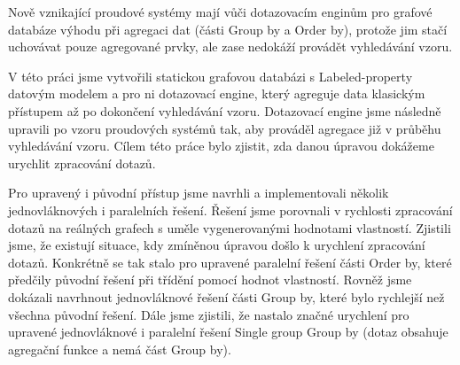 \documentclass[12pt]{report}
\begin{document}
Nově vznikající proudové systémy mají vůči dotazovacím enginům pro grafové databáze výhodu při agregaci dat (části Group by a Order by), protože jim stačí uchovávat pouze agregované prvky, ale zase nedokáží provádět vyhledávání vzoru.

V této práci jsme vytvořili statickou grafovou databázi s Labeled-property datovým modelem a pro ni dotazovací engine, který agreguje data klasickým přístupem až po dokončení vyhledávání vzoru.
Dotazovací engine jsme následně upravili po vzoru proudových systémů tak, aby prováděl agregace již v průběhu vyhledávání vzoru.
Cílem této práce bylo zjistit, zda danou úpravou dokážeme urychlit zpracování dotazů.

Pro upravený i původní přístup jsme navrhli a implementovali několik jednovláknových i paralelních řešení.
Řešení jsme porovnali v rychlosti zpracování dotazů na reálných grafech s uměle vygenerovanými hodnotami vlastností.
Zjistili jsme, že existují situace, kdy zmíněnou úpravou došlo k urychlení zpracování dotazů.
Konkrétně se tak stalo pro upravené paralelní řešení části Order by, které předčily původní řešení při třídění pomocí hodnot vlastností.
Rovněž jsme dokázali navrhnout jednovláknové řešení části Group by, které bylo rychlejší než všechna původní řešení. 
Dále jsme zjistili, že nastalo značné urychlení pro upravené jednovláknové i paralelní řešení Single group Group by (dotaz obsahuje agregační funkce a nemá část Group by).
\end{document}
